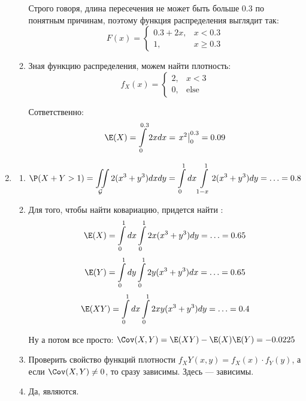\begin{enumerate}
\begin{enumerate}
Строго говоря, длина пересечения не может быть больше 0.3 по понятным причинам, поэтому функция распределения выглядит так:
\[
F(x) = \begin{cases}
0.3+2x, & x < 0.3\\
1, & x \geqslant 0.3
\end{cases}
\]

\item Зная функцию распределения, можем найти плотность:
\[f_X(x) = \begin{cases}
2, & x < 3\\
0, & \text{else}
\end{cases}\]

Сответственно:
\[
\E(X) = \int \limits_{0}^{0.3} 2x dx = \left.  x^2 \right|_{0}^{0.3} = 0.09
\]
\end{enumerate}



\item

\begin{enumerate}
\item \[\P(X+Y > 1) = \iint \limits_{\mathcal{G}}2(x^3+y^3)dxdy = \int \limits_{0}^{1} dx \int \limits_{1-x}^{1}2(x^3+y^3)dy = \ldots  = 0.8\]
\item Для того, чтобы найти ковариацию, придется найти :
\[\E(X) = \int\limits_{0}^{1} dx \int\limits _{0}^{1}2x(x^3+y^3)dy = \ldots = 0.65\]
\[\E(Y) = \int\limits_{0}^{1} dy \int\limits_{0}^{1}2y(x^3+y^3)dx = \ldots = 0.65 \]
\[\E(XY) = \int\limits_{0}^{1}dx\int\limits_{0}^{1}2xy(x^3+y^3)dy = \ldots = 0.4\]

Ну а потом все просто: $\Cov(X, Y) = \E(XY) - \E(X)\E(Y) = -0.0225$

\item Проверить свойство функций плотности $f_XY(x, y) = f_X(x)\cdot f_Y(y)$, а если $\Cov(X, Y) \ne 0$, то сразу зависимы. Здесь — зависимы.
\item Да, являются.
\end{enumerate}



\end{enumerate}
